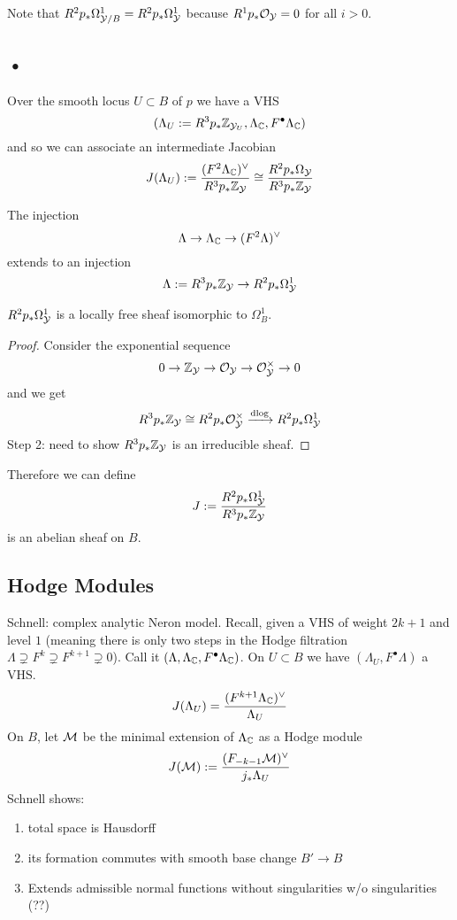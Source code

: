 \documentclass[12pt]{article}
\begin{document}
\begin{rmk}
Note that $R^2 p_* \Omega^1_{\mathcal{Y}/B} = R^2 p_* \Omega^1_{\mathcal{Y}}$ because $R^1 p_* \mathcal{O}_{\mathcal{Y}} = 0$ for all $i > 0$. 
\end{rmk} 

\subsection{•}

Over the smooth locus $U \subset B$ of $p$ we have a VHS 
\[ (\Lambda_U := R^3 p_* \mathbb{Z}_{\mathcal{Y}_U}, \Lambda_{\mathbb{C}}, F^\bullet \Lambda_{\mathbb{C}}) \]
and so we can associate an intermediate Jacobian
\[ J(\Lambda_U) := \frac{(F^2 \Lambda_{\mathbb{C}})^\vee}{R^3 p_* \mathbb{Z}_{\mathcal{Y}}} \cong \frac{R^2 p_* \Omega_{\mathcal{Y}}}{R^3 p_* \mathbb{Z}_{\mathcal{Y}}} \]

\begin{prop}
The injection
\[ \Lambda \to \Lambda_{\mathbb{C}} \to (F^2 \Lambda)^\vee \]
 extends to an injection
 \[ \Lambda := R^3 p_* \mathbb{Z}_{\mathcal{Y}} \to R^2 p_* \Omega^1_{\mathcal{Y}} \]
\end{prop}

\begin{rmk}
$R^2 p_* \Omega^1_{\mathcal{Y}}$ is a locally free sheaf isomorphic to $\Omega^1_B$.
\end{rmk}

\begin{proof}
Consider the exponential sequence
\[ 0 \to \mathbb{Z}_{\mathcal{Y}} \to \mathcal{O}_{\mathcal{Y}} \to \mathcal{O}_{\mathcal{Y}}^\times \to 0 \]
and we get
\[ R^3 p_* \mathbb{Z}_{\mathcal{Y}} \cong R^2 p_* \mathcal{O}_{\mathcal{Y}}^\times \xrightarrow{\mathrm{d}{\log}} R^2 p_* \Omega_{\mathcal{Y}}^1 \]
Step 2: need to show $R^3 p_* \mathbb{Z}_{\mathcal{Y}}$ is an irreducible sheaf. 
\end{proof}

Therefore we can define
\[ J := \frac{R^2 p_* \Omega^1_{\mathcal{Y}}}{R^3 p_* \mathbb{Z}_{\mathcal{Y}}} \]
is an abelian sheaf on $B$. 

\subsection{Hodge Modules}

Schnell: complex analytic Neron model. Recall, given a VHS of weight $2k + 1$ and level $1$ (meaning there is only two steps in the Hodge filtration $\Lambda \supsetneq F^k \supsetneq F^{k+1} \supsetneq 0$). Call it $(\Lambda, \Lambda_{\mathbb{C}}, F^\bullet \Lambda_{\mathbb{C}})$. On $U \subset B$ we have $(\Lambda_U, F^\bullet \Lambda)$ a VHS.
\[ J(\Lambda_U) = \frac{(F^{k+1} \Lambda_{\mathbb{C}})^{\vee}}{\Lambda_U} \]
On $B$, let $\mathcal{M}$ be the minimal extension of $\Lambda_{\mathbb{C}}$ as a Hodge module 
\[ J(\mathcal{M}) := \frac{(F_{-k-1} \mathcal{M})^{\vee}}{j_* \Lambda_U} \]
Schnell shows:
\begin{enumerate}
\item total space is Hausdorff
\item its formation commutes with smooth base change $B' \to B$
\item Extends admissible normal functions without singularities w/o singularities (??) 
\end{enumerate}
\end{document}
